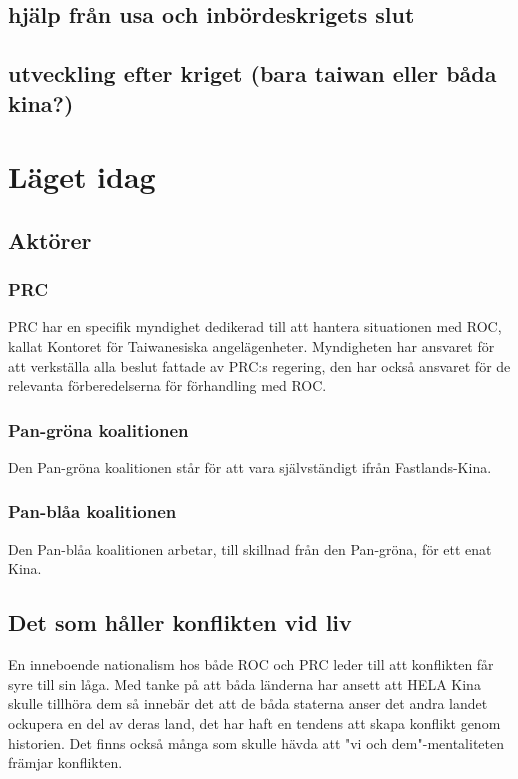 \documentclass[a4paper,10pt]{article}
\begin{document}
\subsection*{hjälp från usa och inbördeskrigets slut}

\subsection*{utveckling efter kriget (bara taiwan eller båda kina?)}


\section*{Läget idag}


\subsection*{Aktörer}

\subsubsection*{PRC}
PRC har en specifik myndighet dedikerad till att hantera situationen med ROC, kallat Kontoret för Taiwanesiska angelägenheter. Myndigheten har ansvaret för att verkställa alla beslut fattade av PRC:s regering, den har också ansvaret för de relevanta förberedelserna för förhandling med ROC.

\subsubsection*{Pan-gröna koalitionen}
Den Pan-gröna koalitionen står för att vara självständigt ifrån Fastlands-Kina.

\subsubsection*{Pan-blåa koalitionen}
Den Pan-blåa koalitionen arbetar, till skillnad från den Pan-gröna, för ett enat Kina.

\subsection*{Det som håller konflikten vid liv}
En inneboende nationalism hos både ROC och PRC leder till att konflikten får syre till sin låga. Med tanke på att båda länderna har ansett att HELA Kina skulle tillhöra dem så innebär det att de båda staterna anser det andra landet ockupera en del av deras land, det har haft en tendens att skapa konflikt genom historien. Det finns också många som skulle hävda att "vi och dem"-mentaliteten främjar konflikten.
\end{document}
